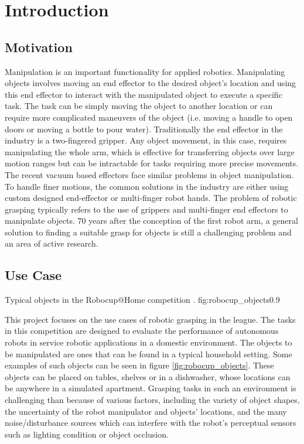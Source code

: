\pagebreak
\section{Introduction}

\subsection{Motivation}
Manipulation is an important functionality for applied robotics. Manipulating objects involves moving an end effector
to the desired object's location and using this end effector to interact with the manipulated object to execute a
specific task. The task can be simply moving the object to another location or can require more complicated maneuvers
of the object (i.e. moving a handle to open doors or moving a bottle to pour water). Traditionally the end effector in
the industry is a two-fingered gripper. Any object movement, in this case, requires manipulating the whole arm, which is
effective for transferring objects over large motion ranges but can be intractable for tasks requiring more precise
movements. The recent vacuum based effectors face similar problems in object manipulation. To handle finer motions, the
common solutions in the industry are either using custom designed end-effector or multi-finger robot hands. The problem
of robotic grasping typically refers to the use of grippers and multi-finger end effectors to manipulate objects. 70
years after the conception of the first robot arm, a general solution to finding a suitable grasp for objects is still a
challenging problem and an area of active research.

\subsection{Use Case}
             {Typical objects in the Robocup@Home competition \cite{robocupRulebook2018}.}
             {fig:robocup_objects}{0.9\textwidth}

This project focuses on the use cases of robotic grasping in the
 league. The tasks in this competition are designed to
evaluate the performance of autonomous robots in service robotic applications in a domestic environment. The objects to
be manipulated are ones that can be found in a typical household setting. Some examples of such objects can be seen in
figure \ref{fig:robocup_objects}. These objects can be placed on tables, shelves or in a dishwasher, whose locations
can be anywhere in a simulated apartment. Grasping tasks in such an environment is challenging than because of various
factors, including the variety of object shapes, the uncertainty of the robot manipulator and objects' locations,
and the many noise/disturbance sources which can interfere with the robot's perceptual sensors such as lighting
condition or object occlusion.

